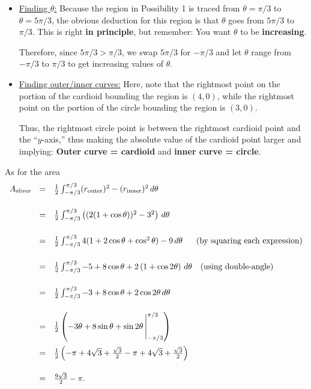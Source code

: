 \documentclass[12pt]{article}
\begin{document}
	\begin{itemize}
		\item \ul{Finding $\theta$:} Because the region in Possibility 1 is traced from $\theta=\pi/3$ to $\theta=5\pi/3$, the obvious deduction for this region is that $\theta$ goes from $5\pi/3$ to $\pi/3$. This is right \textbf{in principle}, but remember: You want $\theta$ to be \textbf{increasing}. 
		
		Therefore, since $5\pi/3 > \pi/3$, we swap $5\pi/3$ for $-\pi/3$  and let $\theta$ range from $-\pi/3$ to $\pi/3$ to get increasing values of $\theta$.
		
		\item \ul{Finding outer/inner curves:} Here, note that the rightmost point on the portion of the cardioid bounding the region is $(4,0)$, while the rightmost point on the portion of the circle bounding the region is $(3,0)$.
		
		Thus, the rightmost circle point is between the rightmost cardioid point and the ``$y$-axis,'' thus making the absolute value of the cardioid point larger and implying: \textbf{Outer curve = cardioid} and \textbf{inner curve = circle}.
	\end{itemize} 

	As for the area
	$$\begin{array}{rcl}
	A_{\text{sliver}} & = & \frac{1}{2}\int_{-\pi/3}^{\pi/3}(r_{\text{outer}})^2-(r_{\text{inner}})^2\,d\theta\\[6mm]
	& = & \frac{1}{2} \int_{-\pi/3}^{\pi/3}\left( (2(1+\cos{\theta}))^2-3^2 \right)\,d\theta\\[6mm]
	& = & \frac{1}{2} \int_{-\pi/3}^{\pi/3}4(1+2\cos{\theta}+\cos^2\theta)-9\,d\theta\text{\quad\,\, (by squaring each expression)}\\[6mm]
	& = & \frac{1}{2} \int_{-\pi/3}^{\pi/3}-5+8\cos\theta+2\left(1+\cos{2\theta}\right)\,d\theta\text{\quad (using double-angle)}\\[6mm]
	& = & \frac{1}{2} \int_{-\pi/3}^{\pi/3}-3+8\cos\theta+2\cos{2\theta}\,d\theta\\[6mm]
	& = & \frac{1}{2} \left(-3\theta +8\sin{\theta}+\sin{2\theta}\,\Bigg|_{-\pi/3}^{\pi/3}\right)\\[6mm]
	& = & \frac{1}{2} \left(-\pi+4\sqrt{3}+\frac{\sqrt{3}}{2}-\pi+4\sqrt{3}+\frac{\sqrt{3}}{2}\right)\\[6mm]
	& = & \frac{9\sqrt{3}}{2}-\pi.
	\end{array}$$
	
	\vspace{3mm}
	
\end{document}
